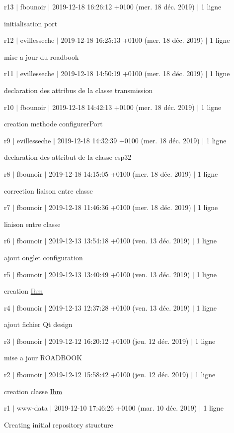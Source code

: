 r13 $\vert$ fbounoir $\vert$ 2019-\/12-\/18 16\+:26\+:12 +0100 (mer. 18 déc. 2019) $\vert$ 1 ligne

initialisation port

r12 $\vert$ evillesseche $\vert$ 2019-\/12-\/18 16\+:25\+:13 +0100 (mer. 18 déc. 2019) $\vert$ 1 ligne

mise a jour du roadbook

r11 $\vert$ evillesseche $\vert$ 2019-\/12-\/18 14\+:50\+:19 +0100 (mer. 18 déc. 2019) $\vert$ 1 ligne

declaration des attribus de la classe transmission

r10 $\vert$ fbounoir $\vert$ 2019-\/12-\/18 14\+:42\+:13 +0100 (mer. 18 déc. 2019) $\vert$ 1 ligne

creation methode configurer\+Port

r9 $\vert$ evillesseche $\vert$ 2019-\/12-\/18 14\+:32\+:39 +0100 (mer. 18 déc. 2019) $\vert$ 1 ligne

declaration des attribut de la classe esp32

r8 $\vert$ fbounoir $\vert$ 2019-\/12-\/18 14\+:15\+:05 +0100 (mer. 18 déc. 2019) $\vert$ 1 ligne

correction liaison entre classe

r7 $\vert$ fbounoir $\vert$ 2019-\/12-\/18 11\+:46\+:36 +0100 (mer. 18 déc. 2019) $\vert$ 1 ligne

liaison entre classe

r6 $\vert$ fbounoir $\vert$ 2019-\/12-\/13 13\+:54\+:18 +0100 (ven. 13 déc. 2019) $\vert$ 1 ligne

ajout onglet configuration

r5 $\vert$ fbounoir $\vert$ 2019-\/12-\/13 13\+:40\+:49 +0100 (ven. 13 déc. 2019) $\vert$ 1 ligne

creation \hyperlink{class_ihm}{Ihm}

r4 $\vert$ fbounoir $\vert$ 2019-\/12-\/13 12\+:37\+:28 +0100 (ven. 13 déc. 2019) $\vert$ 1 ligne

ajout fichier Qt design

r3 $\vert$ fbounoir $\vert$ 2019-\/12-\/12 16\+:20\+:12 +0100 (jeu. 12 déc. 2019) $\vert$ 1 ligne

mise a jour R\+O\+A\+D\+B\+O\+OK

r2 $\vert$ fbounoir $\vert$ 2019-\/12-\/12 15\+:58\+:42 +0100 (jeu. 12 déc. 2019) $\vert$ 1 ligne

creation classe \hyperlink{class_ihm}{Ihm}

r1 $\vert$ www-\/data $\vert$ 2019-\/12-\/10 17\+:46\+:26 +0100 (mar. 10 déc. 2019) $\vert$ 1 ligne

Creating initial repository structure 